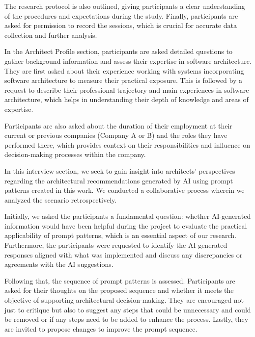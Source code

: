 The research protocol is also outlined, giving participants a clear understanding of the procedures and expectations during the study. Finally, participants are asked for permission to record the sessions, which is crucial for accurate data collection and further analysis.


In the Architect Profile section, participants are asked detailed questions to gather background information and assess their expertise in software architecture. They are first asked about their experience working with systems incorporating software architecture to measure their practical exposure. This is followed by a request to describe their professional trajectory and main experiences in software architecture, which helps in understanding their depth of knowledge and areas of expertise. 

Participants are also asked about the duration of their employment at their current or previous companies (Company A or B) and the roles they have performed there, which provides context on their responsibilities and influence on decision-making processes within the company.


In this interview section, we seek to gain insight into architects' perspectives regarding the architectural recommendations generated by AI using prompt patterns created in this work. We conducted a collaborative process wherein we analyzed the scenario retrospectively. 

Initially, we asked the participants a fundamental question: whether AI-generated information would have been helpful during the project to evaluate the practical applicability of prompt patterns, which is an essential aspect of our research. Furthermore, the participants were requested to identify the AI-generated responses aligned with what was implemented and discuss any discrepancies or agreements with the AI suggestions.


Following that, the sequence of prompt patterns is assessed. Participants are asked for their thoughts on the proposed sequence and whether it meets the objective of supporting architectural decision-making. They are encouraged not just to critique but also to suggest any steps that could be unnecessary and could be removed or if any steps need to be added to enhance the process. Lastly, they are invited to propose changes to improve the prompt sequence. 

